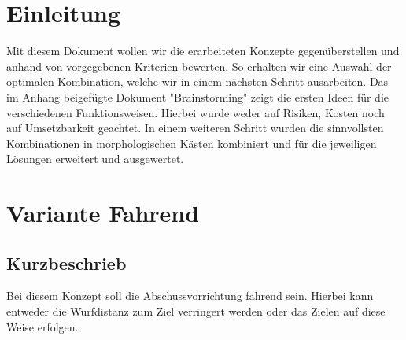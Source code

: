 \begin{landscape}
\pagestyle{empty}

\newcommand{\morphcellwidth}
{
0.12\linewidth
}
\section{Einleitung}
Mit diesem Dokument wollen wir die erarbeiteten Konzepte gegenüberstellen und anhand von vorgegebenen Kriterien bewerten. So erhalten wir eine Auswahl der optimalen Kombination, welche wir in einem nächsten Schritt ausarbeiten. 
Das im Anhang beigefügte Dokument "Brainstorming" zeigt die ersten Ideen für die verschiedenen Funktionsweisen. Hierbei wurde weder auf Risiken, Kosten noch auf Umsetzbarkeit geachtet. In einem weiteren Schritt wurden die sinnvollsten Kombinationen in morphologischen Kästen kombiniert und für die jeweiligen Lösungen erweitert und ausgewertet. 


\section{Variante Fahrend}
\subsection{Kurzbeschrieb}
Bei diesem Konzept soll die Abschussvorrichtung fahrend sein. Hierbei kann entweder die  Wurfdistanz zum Ziel verringert werden oder das Zielen auf diese Weise erfolgen.


\end{landscape}
